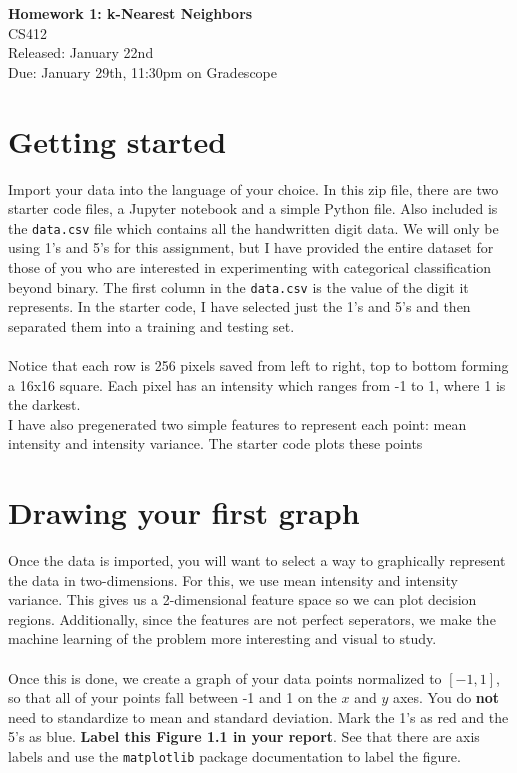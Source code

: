 \documentclass[12pt]{article}
\begin{document}
\begin{center}
\LARGE \textbf{Homework 1: k-Nearest Neighbors}\\
\large CS412\\
Released: January 22nd\\
Due: January 29th, 11:30pm on Gradescope
\end{center}

\section{Getting started}
Import your data into the language of your choice. In this zip file, there are two starter code files, a Jupyter notebook and a simple Python file. Also included is the \texttt{data.csv} file which contains all the handwritten digit data. We will only be using 1's and 5's for this assignment, but I have provided the entire dataset for those of you who are interested in experimenting with categorical classification beyond binary. The first column in the \texttt{data.csv} is the value of the digit it represents. In the starter code, I have selected just the 1's and 5's and then separated them into a training and testing set.\\
\\
Notice that each row is 256 pixels saved from left to right, top to bottom forming a 16x16 square. Each pixel has an intensity which ranges from -1 to 1, where 1 is the darkest.\\
I have also pregenerated two simple features to represent each point: mean intensity and intensity variance. The starter code plots these points

\section{Drawing your first graph}
Once the data is imported, you will want to select a way to graphically represent the data in two-dimensions. For this, we use mean intensity and intensity variance. This gives us a 2-dimensional feature space so we can plot decision regions. Additionally, since the features are not perfect seperators, we make the machine learning of the problem more interesting and visual to study.\\
\\
Once this is done, we create a graph of your data points normalized to $[-1,1]$, so that all of your points fall between -1 and 1 on the $x$ and $y$ axes. You do \textbf{not} need to standardize to mean and standard deviation. Mark the 1's as red and the 5's as blue. \textbf{Label this Figure 1.1 in your report}. See that there are axis labels and use the \texttt{matplotlib} package documentation to label the figure.
\end{document}
